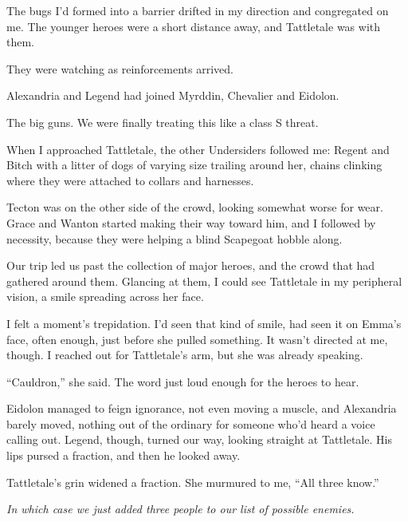 The bugs I'd formed into a barrier drifted in my direction and congregated on me.  The younger heroes were a short distance away, and Tattletale was with them.



They were watching as reinforcements arrived.



Alexandria and Legend had joined Myrddin, Chevalier and Eidolon.



The big guns.  We were finally treating this like a class S threat.



When I approached Tattletale, the other Undersiders followed me: Regent and Bitch with a litter of dogs of varying size trailing around her, chains clinking where they were attached to collars and harnesses.



Tecton was on the other side of the crowd, looking somewhat worse for wear.  Grace and Wanton started making their way toward him, and I followed by necessity, because they were helping a blind Scapegoat hobble along.



Our trip led us past the collection of major heroes, and the crowd that had gathered around them.  Glancing at them, I could see Tattletale in my peripheral vision, a smile spreading across her face.



I felt a moment's trepidation.  I'd seen that kind of smile, had seen it on Emma's face, often enough, just before she pulled something.  It wasn't directed at me, though.  I reached out for Tattletale's arm, but she was already speaking.



``Cauldron,'' she said.  The word just loud enough for the heroes to hear.



Eidolon managed to feign ignorance, not even moving a muscle, and Alexandria barely moved, nothing out of the ordinary for someone who'd heard a voice calling out.  Legend, though, turned our way, looking straight at Tattletale.  His lips pursed a fraction, and then he looked away.



Tattletale's grin widened a fraction.  She murmured to me, ``All three know.''



\emph{In which case we just added three people to our list of possible enemies.}





